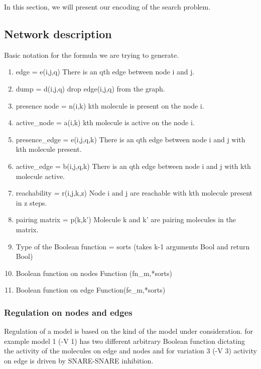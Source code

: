 In this section, we will present our encoding of the search problem.


\subsection{Network description}

Basic notation for the formula we are trying to generate.
\begin{enumerate}
\item edge = e(i,j,q)
      There is an qth edge between node i and j.
      
\item dump = d(i,j,q)
       drop edge(i,j,q) from the graph. 
       
\item presence node = n(i,k) 
	  kth molecule is present on the node i.
      
\item active\_node = a(i,k) 
      kth molecule is active on the node i.
      
\item presence\_edge = e(i,j,q,k)
      There is an qth edge between node i and j with kth molecule present.

\item active\_edge = b(i,j,q,k)
      There is an qth edge between node i and j with kth molecule active.

\item reachability = r(i,j,k,z)
      Node i and j are reachable with kth molecule present in z steps.

\item pairing matrix = p(k,k')
      Molecule k and k' are pairing molecules in the matrix.

\item Type of the Boolean function = sorts (takes k-1 arguments Bool and return Bool) 
\item Boolean function on nodes Function (fn\_{m},*sorts) 

\item Boolean function on edge Function(fe\_{m},*sorts)

\end{enumerate}

\subsubsection{Regulation on nodes and edges}
Regulation of a model is based on the kind of the model under consideration. for example model 1 (-V 1) has two different arbitrary Boolean function dictating the activity of the molecules on edge and nodes and for variation 3 (-V 3) activity on edge is driven by SNARE-SNARE inhibition.  

